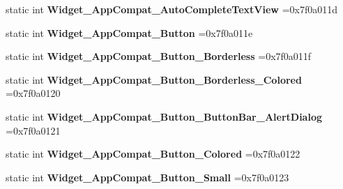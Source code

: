 \begin{DoxyCompactItemize}
\item 
\mbox{\label{classandroid_1_1support_1_1graphics_1_1drawable_1_1R_1_1style_a72006f8bba95c766f3e526ef3c60af05}} 
static int {\bfseries Widget\+\_\+\+App\+Compat\+\_\+\+Auto\+Complete\+Text\+View} =0x7f0a011d
\item 
\mbox{\label{classandroid_1_1support_1_1graphics_1_1drawable_1_1R_1_1style_a22866da31d41b47bcc7533e71a431543}} 
static int {\bfseries Widget\+\_\+\+App\+Compat\+\_\+\+Button} =0x7f0a011e
\item 
\mbox{\label{classandroid_1_1support_1_1graphics_1_1drawable_1_1R_1_1style_ac7a185883e7b6267dca25c81771f1a32}} 
static int {\bfseries Widget\+\_\+\+App\+Compat\+\_\+\+Button\+\_\+\+Borderless} =0x7f0a011f
\item 
\mbox{\label{classandroid_1_1support_1_1graphics_1_1drawable_1_1R_1_1style_afcd57d1650589507b76d3ef6e8edfdca}} 
static int {\bfseries Widget\+\_\+\+App\+Compat\+\_\+\+Button\+\_\+\+Borderless\+\_\+\+Colored} =0x7f0a0120
\item 
\mbox{\label{classandroid_1_1support_1_1graphics_1_1drawable_1_1R_1_1style_a8b926fedee2aa8527de7de55460a1be8}} 
static int {\bfseries Widget\+\_\+\+App\+Compat\+\_\+\+Button\+\_\+\+Button\+Bar\+\_\+\+Alert\+Dialog} =0x7f0a0121
\item 
\mbox{\label{classandroid_1_1support_1_1graphics_1_1drawable_1_1R_1_1style_a463177ffa9d2cf38e8371d2d2f2b498a}} 
static int {\bfseries Widget\+\_\+\+App\+Compat\+\_\+\+Button\+\_\+\+Colored} =0x7f0a0122
\item 
\mbox{\label{classandroid_1_1support_1_1graphics_1_1drawable_1_1R_1_1style_a62b03bc8d039771a41247a6705c90450}} 
static int {\bfseries Widget\+\_\+\+App\+Compat\+\_\+\+Button\+\_\+\+Small} =0x7f0a0123
\item 
\mbox{\label{classandroid_1_1support_1_1graphics_1_1drawable_1_1R_1_1style_a7535729def65a916cbfa26314c336e03}} 

\end{DoxyCompactItemize}

